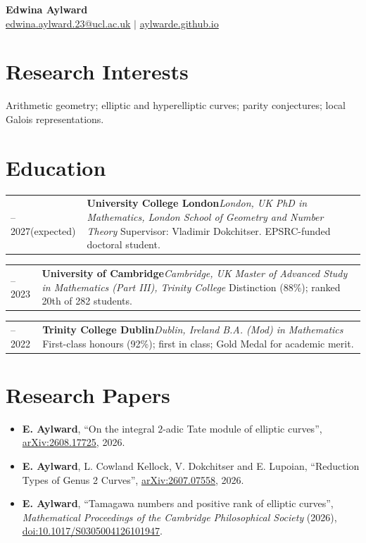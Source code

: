 \documentclass[a4paper,11pt]{article}
\makeatletter
\newcommand{\educationentry}[5]{%
  \datedentry{#1}{%
    \textbf{#2}\hfill\textit{#3}\newline
    \textit{#4}\newline
    #5}
  \vspace{1.5pt}
}
\newcommand{\datedentry}[2]{%
  \begin{tabularx}{\textwidth}{
    @{}>{\raggedleft\arraybackslash}p{2.25cm}
    @{\hspace{0.45cm}}X@{}}
    #1 & #2
  \end{tabularx}\par\vspace{0.5pt}
}
\makeatother
\begin{document}
\begin{center}
  {\LARGE\bfseries Edwina Aylward}\\[4pt]
  \href{mailto:edwina.aylward.23@ucl.ac.uk}{edwina.aylward.23@ucl.ac.uk}
  \quad $\vert$ \quad
  \href{https://aylwarde.github.io/}{aylwarde.github.io}
\end{center}

\section{Research Interests}

Arithmetic geometry; elliptic and hyperelliptic curves; parity conjectures;
local Galois representations.

\section{Education}

\educationentry
  {2023--2027\newline(expected)}
  {University College London}
  {London, UK}
  {PhD in Mathematics, London School of Geometry and Number Theory}
  {Supervisor: Vladimir Dokchitser. EPSRC-funded doctoral student.}

\educationentry
  {2022--2023}
  {University of Cambridge}
  {Cambridge, UK}
  {Master of Advanced Study in Mathematics (Part III), Trinity College}
  {Distinction (88\%); ranked 20th of 282 students.}

\educationentry
  {2018--2022}
  {Trinity College Dublin}
  {Dublin, Ireland}
  {B.A. (Mod) in Mathematics}
  {First-class honours (92\%); first in class; Gold Medal for academic merit.}

\section{Research Papers}

\begin{itemize}
  \item \textbf{E. Aylward},
    ``On the integral $2$-adic Tate module of elliptic curves'',
    \href{https://arxiv.org/abs/2608.17725}{arXiv:2608.17725}, 2026.

  \item \textbf{E. Aylward}, L. Cowland Kellock, V. Dokchitser and E. Lupoian,
    ``Reduction Types of Genus 2 Curves'',
    \href{https://arxiv.org/abs/2607.07558}{arXiv:2607.07558}, 2026.

  \item \textbf{E. Aylward},
    ``Tamagawa numbers and positive rank of elliptic curves'',
    \textit{Mathematical Proceedings of the Cambridge Philosophical Society}
    (2026),
    \href{https://doi.org/10.1017/S0305004126101947}
      {doi:10.1017/S0305004126101947}.

\end{itemize}
\end{document}
